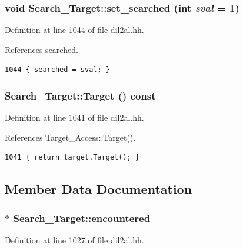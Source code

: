 \subsubsection{\setlength{\rightskip}{0pt plus 5cm}void Search\_\-Target::set\_\-searched (int {\em sval} = 1)\hspace{0.3cm}{\tt  [inline]}}\label{classSearch__Target_a5}




Definition at line 1044 of file dil2al.hh.

References searched.



\footnotesize\begin{verbatim}1044 { searched = sval; }
\end{verbatim}\normalsize 
{}
\subsubsection{ Search\_\-Target::Target () const\hspace{0.3cm}{\tt  [inline]}}\label{classSearch__Target_a2}




Definition at line 1041 of file dil2al.hh.

References Target\_\-Access::Target().



\footnotesize\begin{verbatim}1041 { return target.Target(); }
\end{verbatim}\normalsize 


\subsection{Member Data Documentation}
\subsubsection{$\ast$ Search\_\-Target::encountered\hspace{0.3cm}{\tt  [protected]}}\label{classSearch__Target_n5}




Definition at line 1027 of file dil2al.hh.

